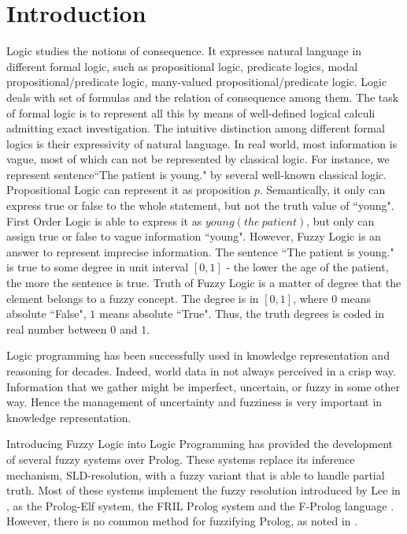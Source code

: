 \documentclass[main.tex]{subfiles}
\begin{document}
\section{Introduction}
\label{sec:Introduction}
Logic studies the notions of consequence. It expresses natural language in different formal logic, such as propositional logic, predicate logics, modal propositional/predicate logic, many-valued propositional/predicate logic. Logic deals with set of formulas and the relation of consequence among them. The task of formal logic is to represent all this by means of well-defined logical calculi admitting exact investigation. The intuitive distinction among different formal logics is their expressivity of natural language. In real world, most information is vague, most of which can not be represented by classical logic. For instance, we represent sentence``The patient is young." by several well-known classical logic. Propositional Logic can represent it as proposition $p$. Semantically, it only can express true or false to the whole statement, but not the truth value of ``young". First Order Logic is able to express it as $young(the\ patient)$, but only can assign true or false to vague information ``young". However, Fuzzy Logic is an answer to represent imprecise information. The sentence ``The patient is young." is true to some degree in unit interval $[0,1]$ - the lower the age of the patient, the more the sentence is true. Truth of Fuzzy Logic is a matter of degree that the element belongs to a fuzzy concept. The degree is in $[0,1]$, where $0$ means absolute ``False", $1$ means absolute ``True". Thus, the truth degrees is coded in real number between $0$ and $1$.

Logic programming \cite{Llo87} has been successfully used in knowledge representation and reasoning for decades. Indeed, world data in not always perceived in a crisp way. Information that we gather might be imperfect, uncertain, or fuzzy in some other way. Hence the management of uncertainty and fuzziness is very important in knowledge representation.

Introducing Fuzzy Logic into Logic Programming has provided the development of several fuzzy systems over Prolog. These systems replace its inference mechanism, SLD-resolution, with a fuzzy variant that is able to handle partial truth. Most of these systems implement the fuzzy resolution introduced by Lee in \cite{Lee72}, as the Prolog-Elf system, the FRIL Prolog system \cite{IK85} and the F-Prolog language \cite{LL90}. However, there is no common method for fuzzifying Prolog, as noted in \cite{SDM89}.
\end{document}
